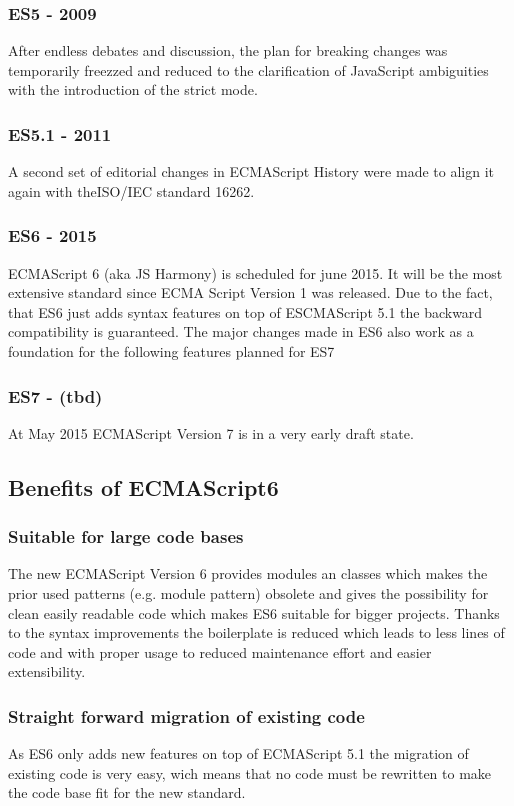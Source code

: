 \documentclass{bioinfo}
\begin{document}
\subsubsection*{\textbf{ES5 - 2009}}
After endless debates and discussion, the plan for breaking changes was temporarily freezzed and reduced to the clarification of JavaScript ambiguities with the introduction of the strict mode.
\subsubsection*{\textbf{ES5.1 - 2011}}
A second set of editorial changes in ECMAScript History were made to align it again with theISO/IEC standard 16262.
\subsubsection*{\textbf{ES6 - 2015}}
ECMAScript 6 (aka JS Harmony) is scheduled for june 2015. It will be the most extensive standard since ECMA Script Version 1 was released. Due to the fact, that ES6 just adds syntax features on top of ESCMAScript 5.1 the backward compatibility is guaranteed. The major changes made in ES6 also work as a foundation for the following features planned for ES7
\subsubsection*{\textbf{ES7 - (tbd)}}
At May 2015 ECMAScript Version 7 is in a very early draft state. 

\subsection{Benefits of ECMAScript6}
\subsubsection{Suitable for large code bases}
The new ECMAScript Version 6 provides modules an classes which makes the prior used patterns (e.g. module pattern) obsolete and
gives the possibility for clean easily readable code which makes ES6 suitable for bigger projects.
Thanks to the syntax improvements the boilerplate is reduced which leads to less lines of code and with proper usage to
reduced maintenance effort and easier extensibility.
\subsubsection{Straight forward migration of existing code}
As ES6 only adds new features on top of ECMAScript 5.1 the migration of existing code is very easy, wich means that no code 
must be rewritten to make the code base fit for the new standard.
\end{document}
